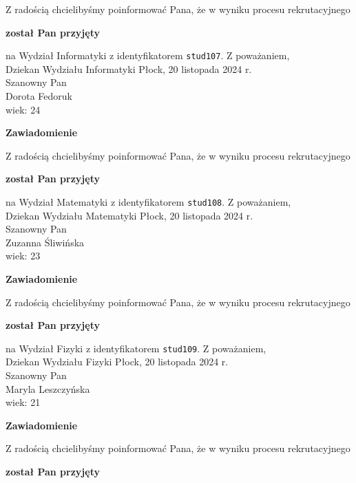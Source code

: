 \documentclass[12pt,a4paper]{article}
\begin{document}
\bigskip
Z radością chcielibyśmy poinformować Pana, że w wyniku procesu rekrutacyjnego 
\begin{center}
\textsf{\textbf{został Pan przyjęty}} 
\end{center}
na Wydział Informatyki z identyfikatorem \verb|stud107|. 
\vspace{2cm}
\noindent
Z poważaniem,\\
Dziekan
Wydziału Informatyki
\newpage
\hfill Płock, 20 listopada 2024 r.\\
\noindent 
Szanowny Pan \\
Dorota Fedoruk \\
wiek: 24
\bigskip
\begin{center}
 	{\Large\textbf{Zawiadomienie}}
\end{center}
\bigskip
Z radością chcielibyśmy poinformować Pana, że w wyniku procesu rekrutacyjnego 
\begin{center}
\textsf{\textbf{został Pan przyjęty}} 
\end{center}
na Wydział Matematyki z identyfikatorem \verb|stud108|. 
\vspace{2cm}
\noindent
Z poważaniem,\\
Dziekan
Wydziału Matematyki
\newpage
\hfill Płock, 20 listopada 2024 r.\\
\noindent 
Szanowny Pan \\
Zuzanna Śliwińska \\
wiek: 23
\bigskip
\begin{center}
 	{\Large\textbf{Zawiadomienie}}
\end{center}
\bigskip
Z radością chcielibyśmy poinformować Pana, że w wyniku procesu rekrutacyjnego 
\begin{center}
\textsf{\textbf{został Pan przyjęty}} 
\end{center}
na Wydział Fizyki z identyfikatorem \verb|stud109|. 
\vspace{2cm}
\noindent
Z poważaniem,\\
Dziekan
Wydziału Fizyki
\newpage
\hfill Płock, 20 listopada 2024 r.\\
\noindent 
Szanowny Pan \\
Maryla Leszczyńska \\
wiek: 21
\bigskip
\begin{center}
 	{\Large\textbf{Zawiadomienie}}
\end{center}
\bigskip
Z radością chcielibyśmy poinformować Pana, że w wyniku procesu rekrutacyjnego 
\begin{center}
\textsf{\textbf{został Pan przyjęty}} 
\end{center}
\end{document}
